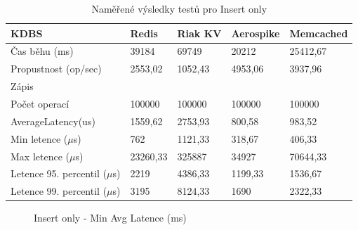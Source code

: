 \documentclass[czech,master,dept460,male,csharp,cpdeclaration]{diploma}
\begin{document}
	\begin{table}
		\centering
		\begin{tabular}{ l | l l l l }
			\toprule
			KDBS & Redis & Riak KV & Aerospike & Memcached \\
			\midrule
			Čas běhu (ms) & 39184 & 69749 & 20212 & 25412,67 \\
			Propustnost (op/sec) & 2553,02 & 1052,43 & 4953,06 & 3937,96 \\
			\midrule
			\multicolumn{5}{l}{Zápis} \\
			Počet operací & 100000 & 100000 & 100000 & 100000 \\
			AverageLatency(us) & 1559,62 & 2753,93 & 800,58 & 983,52 \\
			Min letence ($\mu$s) & 762 & 1121,33 & 318,67 & 406,33 \\
			Max letence ($\mu$s) & 23260,33 & 325887 & 34927 & 70644,33 \\
			Letence 95. percentil ($\mu$s) & 2219 & 4386,33 & 1199,33 & 1536,67 \\
			Letence 99. percentil ($\mu$s) & 3195 & 8124,33 & 1690 & 2322,33 \\
			\bottomrule
		\end{tabular}
		\caption{Naměřené výsledky testů pro Insert only\label{tab_workload_insert_only}}
	\end{table}
	
	\begin{figure}
		\centering
		\caption{Insert only - Min Avg Latence (ms)}
		\label{graph_Insert only - Min Avg Latency (ms)}
	\end{figure}
	
\end{document}
